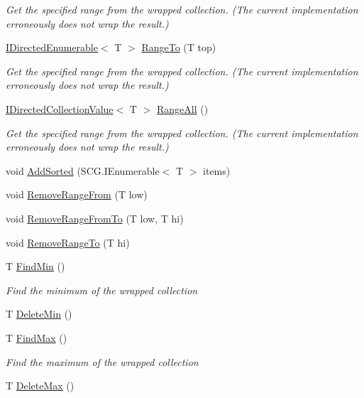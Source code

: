 \begin{DoxyCompactItemize}
\begin{DoxyCompactList}\small\item\em Get the specified range from the wrapped collection. (The current implementation erroneously does not wrap the result.) \end{DoxyCompactList}\item 
\hyperlink{interface_c5_1_1_i_directed_enumerable}{I\+Directed\+Enumerable}$<$ T $>$ \hyperlink{class_c5_1_1_guarded_sorted_a21305628969a9beaa6e0f0d06fb171a6}{Range\+To} (T top)
\begin{DoxyCompactList}\small\item\em Get the specified range from the wrapped collection. (The current implementation erroneously does not wrap the result.) \end{DoxyCompactList}\item 
\hyperlink{interface_c5_1_1_i_directed_collection_value}{I\+Directed\+Collection\+Value}$<$ T $>$ \hyperlink{class_c5_1_1_guarded_sorted_a810e407c33bdf337c32ceb9c2d9773ad}{Range\+All} ()
\begin{DoxyCompactList}\small\item\em Get the specified range from the wrapped collection. (The current implementation erroneously does not wrap the result.) \end{DoxyCompactList}\item 
void \hyperlink{class_c5_1_1_guarded_sorted_a5dfe71d83337e50a8d38002c7836680d}{Add\+Sorted} (S\+C\+G.\+I\+Enumerable$<$ T $>$ items)
\item 
void \hyperlink{class_c5_1_1_guarded_sorted_a50fb581a7fdc2aa8565fb7aeeccd4cd1}{Remove\+Range\+From} (T low)
\item 
void \hyperlink{class_c5_1_1_guarded_sorted_aa778f695d7e887a7ca4672ccdd06a689}{Remove\+Range\+From\+To} (T low, T hi)
\item 
void \hyperlink{class_c5_1_1_guarded_sorted_a913a700b2bdd5fb9582c818360468c3a}{Remove\+Range\+To} (T hi)
\item 
T \hyperlink{class_c5_1_1_guarded_sorted_a74fbcdd950a8673bc61e09539470748a}{Find\+Min} ()
\begin{DoxyCompactList}\small\item\em Find the minimum of the wrapped collection \end{DoxyCompactList}\item 
T \hyperlink{class_c5_1_1_guarded_sorted_a7cc91f7815ef8e6e43006289e0ab7305}{Delete\+Min} ()
\item 
T \hyperlink{class_c5_1_1_guarded_sorted_ab6f7371f2bdec615b28c075493ef70d8}{Find\+Max} ()
\begin{DoxyCompactList}\small\item\em Find the maximum of the wrapped collection \end{DoxyCompactList}\item 
T \hyperlink{class_c5_1_1_guarded_sorted_a24f97b59e6d0e9efb7cc7be97f739cd5}{Delete\+Max} ()
\end{DoxyCompactItemize}
